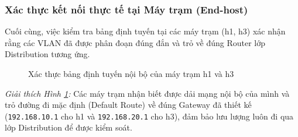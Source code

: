 \subsubsection{Xác thực kết nối thực tế tại Máy trạm (End-host)}
Cuối cùng, việc kiểm tra bảng định tuyến tại các máy trạm (h1, h3) xác nhận rằng các VLAN đã được phân đoạn đúng đắn và trỏ về đúng Router lớp Distribution tương ứng.

\begin{figure}[H]
    \centering
    \caption{Xác thực bảng định tuyến nội bộ của máy trạm h1 và h3}
    \label{fig:host_route}
\end{figure}

\textit{Giải thích Hình \ref{fig:host_route}:} Các máy trạm nhận biết được dải mạng nội bộ của mình và trỏ đường đi mặc định (Default Route) về đúng Gateway đã thiết kế (\texttt{192.168.10.1} cho h1 và \texttt{192.168.20.1} cho h3), đảm bảo lưu lượng luôn đi qua lớp Distribution để được kiểm soát.
